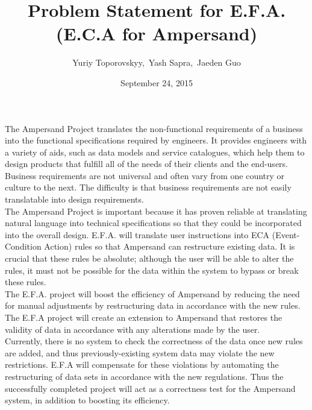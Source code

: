 \documentclass[12pt]{article}
\begin{document}
\title{Problem Statement for E.F.A. (E.C.A for Ampersand)} 
\author{Yuriy Toporovskyy,\ Yash Sapra,\ Jaeden Guo}
\date{September 24, 2015}
\thispagestyle{empty}
\maketitle

\indent The Ampersand Project translates the non-functional requirements of a 
business into the functional specifications required by engineers. It provides 
engineers with a variety of aids, such as data models and service catalogues, 
which help them to design products that fulfill all of the needs of their 
clients and the end-users. Business requirements are not universal and often 
vary from one country or culture to the next. The difficulty is that business 
requirements are not easily translatable into design requirements.\\
\indent The Ampersand Project is important because it has proven reliable at 
translating natural language into technical specifications so that they could 
be incorporated into the overall design. E.F.A. will translate user 
instructions into ECA (Event-Condition Action) rules so that Ampersand can 
restructure existing data. It is crucial that these rules be absolute; although 
the user will be able to alter the rules, it must not be possible for the data 
within the system to bypass or break these rules. \\
\indent The E.F.A. project will boost the efficiency of Ampersand by reducing 
the need for manual adjustments by restructuring data in accordance with the 
new rules. The E.F.A project will create an extension to Ampersand that 
restores the validity of data in accordance with any alterations made by the 
user. \\ 
\indent Currently, there is no system to check the correctness of the data 
once new rules are added, and thus previously-existing system data may violate the 
new restrictions. E.F.A will compensate for these violations by automating the 
restructuring of data sets in accordance with the new regulations. Thus the 
successfully completed project will act as a correctness test for the Ampersand 
system, in addition to boosting its efficiency. 
\end{document}
